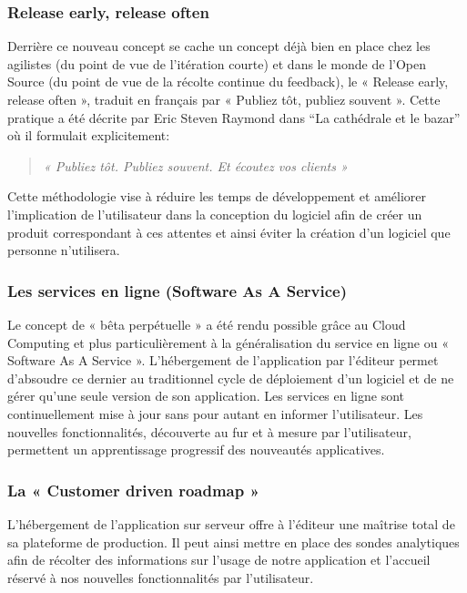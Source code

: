 \documentclass{report}
\begin{document}
        \subsubsection{Release early, release often}
        Derrière ce nouveau concept se cache un concept déjà bien en place chez les agilistes (du point de vue de l’itération courte) et dans le monde de l’Open Source (du point de vue de la récolte continue du feedback), le « Release early, release often », traduit en français par « Publiez tôt, publiez souvent ». Cette pratique a été décrite par Eric Steven Raymond dans “La cathédrale et le bazar” où il formulait explicitement:\\
        \begin{quotation}
          \emph{« Publiez tôt. Publiez souvent. Et écoutez vos clients »}\\
        \end{quotation}

        Cette méthodologie vise à réduire les temps de développement et améliorer l’implication de l’utilisateur dans la conception du logiciel afin de créer un produit correspondant à ces attentes et ainsi éviter la création d’un logiciel que personne n’utilisera.

        \subsubsection{Les services en ligne (Software As A Service)}
        Le concept de « bêta perpétuelle » a été rendu possible grâce au Cloud Computing et plus particulièrement à la généralisation du service en ligne ou « Software As A Service ». L’hébergement de l’application par l’éditeur permet d’absoudre ce dernier au traditionnel cycle de déploiement d’un logiciel et de ne gérer qu’une seule version de son application. Les services en ligne sont continuellement mise à jour sans pour autant en informer l’utilisateur. Les nouvelles fonctionnalités, découverte au fur et à mesure par l’utilisateur, permettent un apprentissage progressif des nouveautés applicatives.

        \subsubsection{La « Customer driven roadmap »}
        L’hébergement de l’application sur serveur offre à l’éditeur une maîtrise total de sa plateforme de production. Il peut ainsi mettre en place des sondes analytiques afin de récolter des informations sur l’usage de notre application et l’accueil réservé à nos nouvelles fonctionnalités par l’utilisateur.
\end{document}
